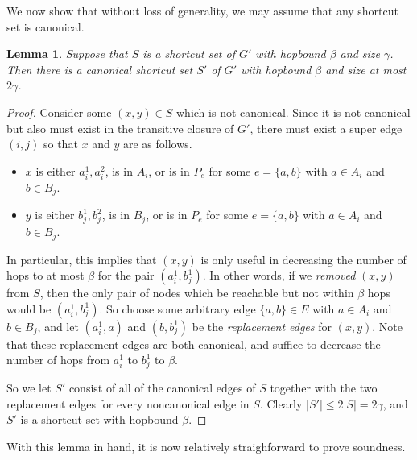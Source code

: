 \documentclass{article}
\newtheorem{lemma}[theorem]{Lemma}
\theoremstyle{definition}
\theoremstyle{remark}
\begin{document}
We now show that without loss of generality, we may assume that any shortcut set is canonical.

\begin{lemma} \label{lem:canonical}
    Suppose that $S$ is a shortcut set of $G'$ with hopbound $\beta$ and size $\gamma$.  Then there is a canonical shortcut set $S'$ of $G'$ with hopbound $\beta$ and size at most $2 \gamma$.
\end{lemma}
\begin{proof}
    Consider some $(x,y) \in S$ which is not canonical.  Since it is not canonical but also must exist in the transitive closure of $G'$, there must exist a super edge $(i,j)$ so that $x$ and $y$ are as follows.
    \begin{itemize}
        \item $x$ is either $a_i^1, a_i^2$, is in $A_i$, or is in $P_e$ for some $e = \{a,b\}$ with $a \in A_i$ and $b \in B_j$.
        \item $y$ is either $b_j^1, b_j^2$, is in $B_j$, or is in $P_e$ for some $e = \{a,b\}$ with $a \in A_i$ and $b \in B_j$.
    \end{itemize}
    In particular, this implies that $(x,y)$ is only useful in decreasing the number of hops to at most $\beta$ for the pair $(a_i^1, b_j^1)$.  In other words, if we \emph{removed} $(x,y)$ from $S$, then the only pair of nodes which be reachable but not within $\beta$ hops would be $(a_i^1, b_j^1)$.  So choose some arbitrary edge $\{a,b\} \in E$ with $a \in A_i$ and $b \in B_j$, and let $(a_i^1, a)$ and $(b, b_j^1)$ be the \emph{replacement edges} for $(x,y)$.  Note that these replacement edges are both canonical, and suffice to decrease the number of hops from $a_i^1$ to $b_j^1$ to $\beta$.

    So we let $S'$ consist of all of the canonical edges of $S$ together with the two replacement edges for every noncanonical edge in $S$.  Clearly $|S'| \leq 2|S| =2\gamma$, and $S'$ is a shortcut set with hopbound $\beta$.  
\end{proof}

With this lemma in hand, it is now relatively straighforward to prove soundness.
\end{document}
